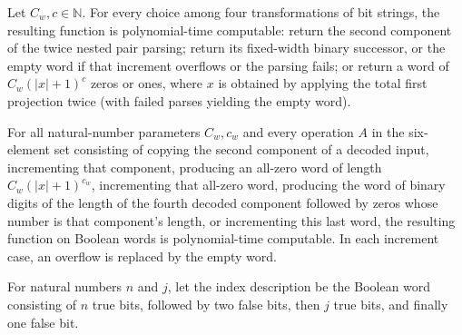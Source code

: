\begin{theorem}
\label{Complexity.Meyer.pt_twd}
\leanok
{}
Let $C_w,c\in\mathbb{N}$. For every choice among four transformations of bit strings,
the resulting function is polynomial-time computable: return the second component of the
twice nested pair parsing; return its fixed-width binary successor, or the empty word if
that increment overflows or the parsing fails; or return a word of $C_w(|x|+1)^c$ zeros
or ones, where $x$ is obtained by applying the total first projection twice (with failed
parses yielding the empty word).
\end{theorem}

\begin{theorem}
\label{Complexity.Meyer.pt_awd}
\leanok
{}
For all natural-number parameters $C_w,c_w$ and every operation $A$ in the six-element
set consisting of copying the second component of a decoded input, incrementing that
component, producing an all-zero word of length $C_w(|x|+1)^{c_w}$, incrementing that
all-zero word, producing the word of binary digits of the length of the fourth decoded
component followed by zeros whose number is that component's length, or incrementing
this last word, the resulting function on Boolean words is polynomial-time computable.
In each increment case, an overflow is replaced by the empty word.
\end{theorem}

\begin{definition}
\label{Complexity.Meyer.idxDesc}
\leanok
For natural numbers $n$ and $j$, let the index description be the Boolean word
consisting of $n$ true bits, followed by two false bits, then $j$ true bits, and finally
one false bit.
\end{definition}
